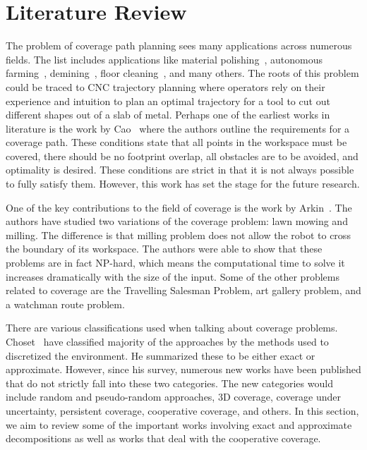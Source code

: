 \documentclass[../main.tex]{subfiles}
\begin{document}
\chapter{Literature Review}
\label{chapter:literature_review}

The problem of coverage path planning sees many applications across numerous fields. The list includes applications like material polishing~\cite{rososhansky2010coverage}, autonomous farming~\cite{ollis1997vision}, demining~\cite{acar2003path}, floor cleaning~\cite{yasutomi1988cleaning}, and many others. The roots of this problem could be traced to CNC trajectory planning where operators rely on their experience and intuition to plan an optimal trajectory for a tool to cut out different shapes out of a slab of metal. Perhaps one of the earliest works in literature is the work by Cao~\cite{cao1988region} where the authors outline the requirements for a coverage path. These conditions state that all points in the workspace must be covered, there should be no footprint overlap, all obstacles are to be avoided, and optimality is desired. These conditions are strict in that it is not always possible to fully satisfy them. However, this work has set the stage for the future research.

One of the key contributions to the field of coverage is the work by Arkin~\cite{arkin2000approximation}. The authors have studied two variations of the coverage problem: lawn mowing and milling. The difference is that milling problem does not allow the robot to cross the boundary of its workspace. The authors were able to show that these problems are in fact NP-hard, which means the computational time to solve it increases dramatically with the size of the input. Some of the other problems related to coverage are the Travelling Salesman Problem, art gallery problem, and a watchman route problem.

There are various classifications used when talking about coverage problems. Choset~\cite{choset2000coverage} have classified majority of the approaches by the methods used to discretized the environment. He summarized these to be either exact or approximate. However, since his survey, numerous new works have been published that do not strictly fall into these two categories. The new categories would include random and pseudo-random approaches, 3D coverage, coverage under uncertainty, persistent coverage, cooperative coverage, and others. In this section, we aim to review some of the important works involving exact and approximate decompositions as well as works that deal with the cooperative coverage.
\end{document}
